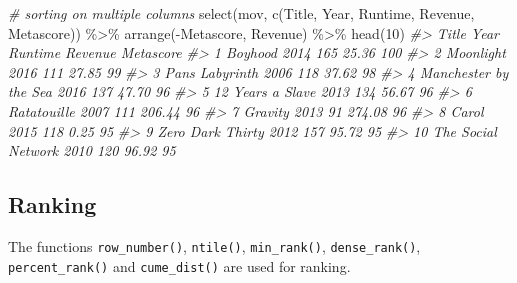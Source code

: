 \documentclass[
]{book}
\newenvironment{Shaded}{\begin{snugshade}}{\end{snugshade}}
\newcommand{\CommentTok}[1]{\textcolor[rgb]{0.56,0.35,0.01}{\textit{#1}}}
\newcommand{\DecValTok}[1]{\textcolor[rgb]{0.00,0.00,0.81}{#1}}
\newcommand{\FunctionTok}[1]{\textcolor[rgb]{0.00,0.00,0.00}{#1}}
\newcommand{\NormalTok}[1]{#1}
\newcommand{\SpecialCharTok}[1]{\textcolor[rgb]{0.00,0.00,0.00}{#1}}
\begin{document}
\begin{Shaded}
\begin{Highlighting}[]
\CommentTok{\# sorting on multiple columns}
\FunctionTok{select}\NormalTok{(mov, }\FunctionTok{c}\NormalTok{(Title, Year, Runtime, Revenue, Metascore)) }\SpecialCharTok{\%\textgreater{}\%}
  \FunctionTok{arrange}\NormalTok{(}\SpecialCharTok{{-}}\NormalTok{Metascore, Revenue) }\SpecialCharTok{\%\textgreater{}\%}
  \FunctionTok{head}\NormalTok{(}\DecValTok{10}\NormalTok{)}
\CommentTok{\#\textgreater{}                    Title Year Runtime Revenue Metascore}
\CommentTok{\#\textgreater{} 1                Boyhood 2014     165   25.36       100}
\CommentTok{\#\textgreater{} 2              Moonlight 2016     111   27.85        99}
\CommentTok{\#\textgreater{} 3        Pan\textquotesingle{}s Labyrinth 2006     118   37.62        98}
\CommentTok{\#\textgreater{} 4  Manchester by the Sea 2016     137   47.70        96}
\CommentTok{\#\textgreater{} 5       12 Years a Slave 2013     134   56.67        96}
\CommentTok{\#\textgreater{} 6            Ratatouille 2007     111  206.44        96}
\CommentTok{\#\textgreater{} 7                Gravity 2013      91  274.08        96}
\CommentTok{\#\textgreater{} 8                  Carol 2015     118    0.25        95}
\CommentTok{\#\textgreater{} 9       Zero Dark Thirty 2012     157   95.72        95}
\CommentTok{\#\textgreater{} 10    The Social Network 2010     120   96.92        95}
\end{Highlighting}
\end{Shaded}

\hypertarget{ranking-1}{%
\subsection{Ranking}\label{ranking-1}}

The functions \texttt{row\_number()}, \texttt{ntile()}, \texttt{min\_rank()}, \texttt{dense\_rank()}, \texttt{percent\_rank()} and \texttt{cume\_dist()} are used for ranking.
\end{document}
